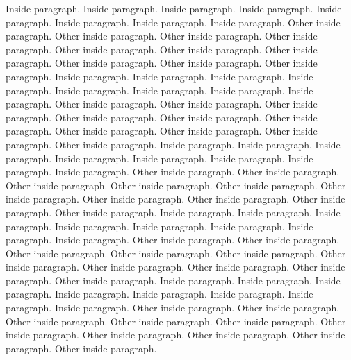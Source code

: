 \documentclass{article}
\begin{document}
\begin{pairs}
\begin{Leftside}
            \pend
                        \pstart
                Inside paragraph. Inside paragraph. Inside paragraph. Inside paragraph. Inside paragraph. Inside paragraph. Inside paragraph. Inside paragraph.
            \pend
            \pstart
                Other inside paragraph.  Other inside paragraph.  Other inside paragraph.  Other inside paragraph.  Other inside paragraph.  Other inside paragraph.  Other inside paragraph.  Other inside paragraph.  Other inside paragraph.  Other inside paragraph.
            \pend
                        \pstart
                Inside paragraph. Inside paragraph. Inside paragraph. Inside paragraph. Inside paragraph. Inside paragraph. Inside paragraph. Inside paragraph.
            \pend
            \pstart
                Other inside paragraph.  Other inside paragraph.  Other inside paragraph.  Other inside paragraph.  Other inside paragraph.  Other inside paragraph.  Other inside paragraph.  Other inside paragraph.  Other inside paragraph.  Other inside paragraph.
            \pend
                        \pstart
                Inside paragraph. Inside paragraph. Inside paragraph. Inside paragraph. Inside paragraph. Inside paragraph. Inside paragraph. Inside paragraph.
            \pend
            \pstart
                Other inside paragraph.  Other inside paragraph.  Other inside paragraph.  Other inside paragraph.  Other inside paragraph.  Other inside paragraph.  Other inside paragraph.  Other inside paragraph.  Other inside paragraph.  Other inside paragraph.
            \pend
                        \pstart
                Inside paragraph. Inside paragraph. Inside paragraph. Inside paragraph. Inside paragraph. Inside paragraph. Inside paragraph. Inside paragraph.
            \pend
            \pstart
                Other inside paragraph.  Other inside paragraph.  Other inside paragraph.  Other inside paragraph.  Other inside paragraph.  Other inside paragraph.  Other inside paragraph.  Other inside paragraph.  Other inside paragraph.  Other inside paragraph.
            \pend
                        \pstart
                Inside paragraph. Inside paragraph. Inside paragraph. Inside paragraph. Inside paragraph. Inside paragraph. Inside paragraph. Inside paragraph.
            \pend
            \pstart
                Other inside paragraph.  Other inside paragraph.  Other inside paragraph.  Other inside paragraph.  Other inside paragraph.  Other inside paragraph.  Other inside paragraph.  Other inside paragraph.  Other inside paragraph.  Other inside paragraph.
            \pend
                        \pstart

\end{Leftside}
\end{pairs}
\end{document}

